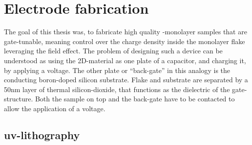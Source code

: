\section{Electrode fabrication}

The goal of this thesis was, to fabricate high quality \tmd-monolayer samples that are gate-tunable, meaning control over the charge density inside the monolayer flake leveraging the field effect. The problem of designing such a device can be understood as using the 2D-material as one plate of a capacitor, and charging it, by applying a voltage. The other plate or ``back-gate'' in this analogy is the conducting boron-doped silicon substrate. Flake and substrate are separated by a 50nm layer of thermal silicon-dioxide, that functions as the dielectric of the gate-structure. Both the sample on top and the back-gate have to be contacted to allow the application of a voltage.

\subsection{uv-lithography}

